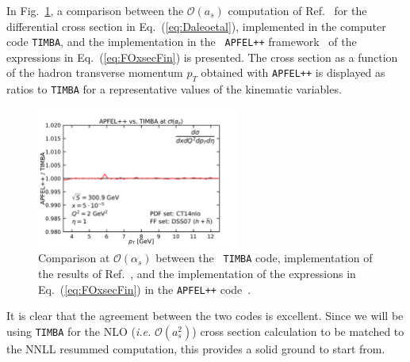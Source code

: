 \documentclass[10pt,a4paper]{article}
\begin{document}
In Fig.~\ref{fig:APFELvsTIMBA}, a comparison between the
$\mathcal{O}(a_s)$ computation of Ref.~\cite{Daleo:2004pn} for the
differential cross section in Eq.~(\ref{eq:Daleoetal}), implemented in
the computer code {\tt TIMBA}, and the implementation in the {\tt
  APFEL++} framework~\cite{Bertone:2017gds} of the expressions in
Eq.~(\ref{eq:FOxsecFin}) is presented. The cross section as a function
of the hadron transverse momentum $p_T$ obtained with {\tt APFEL++} is
displayed as ratios to {\tt TIMBA} for a representative values of the
kinematic variables.
\begin{figure}[t]
  \begin{centering}
    \includegraphics[width=0.6\textwidth]{plots/APFELvsTIMBA}
    \caption{Comparison at $\mathcal{O}(\alpha_s)$ between the {\tt
        TIMBA} code, implementation of the results of
      Ref.~\cite{Daleo:2004pn}, and the implementation of the
      expressions in Eq.~(\ref{eq:FOxsecFin}) in the {\tt APFEL++}
      code~\cite{Bertone:2017gds}.\label{fig:APFELvsTIMBA}}
  \end{centering}
\end{figure}
It is clear that the agreement between the two codes is
excellent. Since we will be using {\tt TIMBA} for the NLO
(\textit{i.e.} $\mathcal{O}(a_s^2)$) cross section calculation to be
matched to the NNLL resummed computation, this provides a solid ground
to start from.
\end{document}
